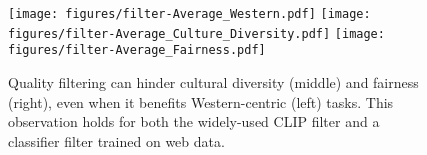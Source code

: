\begin{figure*}[h]
    \texttt{[image: figures/filter-Average\_Western.pdf]}
    \texttt{[image: figures/filter-Average\_Culture\_Diversity.pdf]}
    \texttt{[image: figures/filter-Average\_Fairness.pdf]}
    \caption{Quality filtering can hinder cultural diversity (middle) and fairness (right), even when it benefits Western-centric (left) tasks. This observation holds for both the widely-used CLIP filter and a classifier filter trained on web data.}
    \label{fig:quality_filter}
\end{figure*}